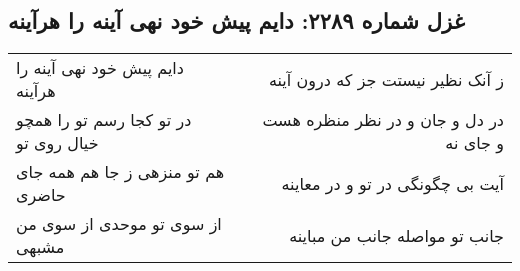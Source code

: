 \begin{center}
\section*{غزل شماره ۲۲۸۹: دایم پیش خود نهی آینه را هرآینه}
\label{sec:2289}
\begin{longtable}{l p{0.5cm} r}
دایم پیش خود نهی آینه را هرآینه
&&
ز آنک نظیر نیستت جز که درون آینه
\\
در تو کجا رسم تو را همچو خیال روی تو
&&
در دل و جان و در نظر منظره هست و جای نه
\\
هم تو منزهی ز جا هم همه جای حاضری
&&
آیت بی چگونگی در تو و در معاینه
\\
از سوی تو موحدی از سوی من مشبهی
&&
جانب تو مواصله جانب من مباینه
\\
\end{longtable}
\end{center}
